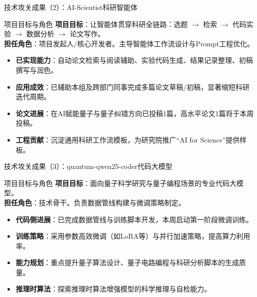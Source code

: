 \documentclass[aspectratio=169]{beamer} %
\begin{document}
\begin{frame}{技术攻关成果（2）：AI-Scientist科研智能体}
    \begin{block}{项目目标与角色}
        \textbf{项目目标}：让智能体贯穿科研全链路：选题 $\rightarrow$ 检索 $\rightarrow$ 代码实验 $\rightarrow$ 数据分析 $\rightarrow$ 论文写作。\\
        \textbf{担任角色}：项目发起人/核心开发者。主导智能体工作流设计与Prompt工程优化。
    \end{block}
    \begin{itemize}
        \item \textbf{已实现能力}：自动论文检索与阅读辅助、实验代码生成、结果记录整理、初稿撰写与润色。
        \item \textbf{应用成效}：已辅助本组及跨部门同事完成多篇论文草稿/初稿，显著缩短科研迭代周期。
        \item \textbf{论文进展}：在AI赋能量子与量子纠错方向已投稿1篇，高水平论文1篇将于本周投稿。
        \item \textbf{工程贡献}：沉淀通用科研工作流模板，为研究院推广“AI for Science”提供样板。
    \end{itemize}
\end{frame}

\begin{frame}{技术攻关成果（3）：quantum-qwen25-coder代码大模型}
    \begin{block}{项目目标与角色}
        \textbf{项目目标}：面向量子科学研究与量子编程场景的专业代码大模型。\\
        \textbf{担任角色}：技术骨干。负责数据管线构建与微调策略制定。
    \end{block}
    \begin{itemize}
        \item \textbf{代码侧进展}：已完成数据管线与训练脚本开发，本周启动第一阶段微调训练。
        \item \textbf{训练策略}：采用参数高效微调（如LoRA等）与并行加速策略，提高算力利用率。
        \item \textbf{能力规划}：重点提升量子算法设计、量子电路编程与科研分析脚本的生成质量。
        \item \textbf{推理时算法}：探索推理时算法增强模型的科学推理与自检能力。
    \end{itemize}
\end{frame}
\end{document}

